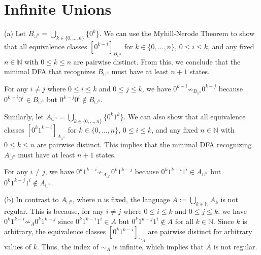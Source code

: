 



\setcounter{section}{3}

\setcounter{section}{3} %
\renewcommand{\thesection}{\arabic{section}} %

\section{Infinite Unions}

(a) Let \( B_{\cup^n} = \bigcup_{k \in \{0, \dots, n\}} \{0^k\} \). We can use the Myhill-Nerode Theorem to show that all equivalence classes \( [0^{k-i}]_{B_{\cup^n}} \) for \( k \in \{0, \dots, n\} \), \( 0 \leq i \leq k \), and any fixed \( n \in \mathbb{N} \) with \( 0 \leq k \leq n \) are pairwise distinct. From this, we conclude that the minimal DFA that recognizes \( B_{\cup^n} \) must have at least \( n + 1 \) states.

For any \( i \neq j \) where \( 0 \leq i \leq k \) and \( 0 \leq j \leq k \), we have \( 0^{k-i} \not\sim_{B_{\cup^n}} 0^{k-j} \) because \( 0^{k-i} 0^i \in B_{\cup^n} \) but \( 0^{k-j} 0^i \notin B_{\cup^n} \).

Similarly, let \( A_{\cup^n} = \bigcup_{k \in \{0, \dots, n\}} \{0^k 1^k\} \). We can also show that all equivalence classes \( [0^k 1^{k-i}]_{A_{\cup^n}} \) for \( k \in \{0, \dots, n\} \), \( 0 \leq i \leq k \), and any fixed \( n \in \mathbb{N} \) with \( 0 \leq k \leq n \) are pairwise distinct. This implies that the minimal DFA recognizing \( A_{\cup^n} \) must have at least \( n + 1 \) states.

For any \( i \neq j \), we have \( 0^k 1^{k-i} \not\sim_{A_{\cup^n}} 0^k 1^{k-j} \) because \( 0^k 1^{k-i} 1^i \in A_{\cup^n} \) but \( 0^k 1^{k-j} 1^i \notin A_{\cup^n} \).

(b) In contrast to \( A_{\cup^n} \), where \( n \) is fixed, the language \( A := \bigcup_{k \in \mathbb{N}} A_k \) is not regular. This is because, for any \( i \neq j \) where \( 0 \leq i \leq k \) and \( 0 \leq j \leq k \), we have \( 0^k 1^{k-i} \not\sim_{A} 0^k 1^{k-j} \) since \( 0^k 1^{k-i} 1^i \in A \) but \( 0^k 1^{k-j} 1^i \notin A \) for all \( k \in \mathbb{N} \). Since \( k \) is arbitrary, the equivalence classes \( [0^k 1^{k-i}]_{\sim_{A}} \) are pairwise distinct for arbitrary values of \( k \). Thus, the index of \( \sim_{A} \) is infinite, which implies that \( A \) is not regular.

